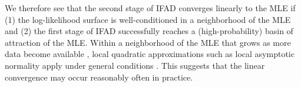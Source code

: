 \documentclass[9pt,twocolumn,pnasresearcharticle]{pnas-new}
\begin{document}
We therefore see that the second stage of IFAD converges linearly to the MLE if (1) the log-likelihood surface is well-conditioned in a neighborhood of the MLE and (2) the first stage of IFAD successfully reaches a (high-probability) basin of attraction of the MLE.
Within a neighborhood of the MLE that grows as more data become available \cite{ning21}, local quadratic approximations such as local asymptotic normality apply under general conditions \cite{lecam00}.
This suggests that the linear convergence may occur reasonably often in practice.




\end{document}
